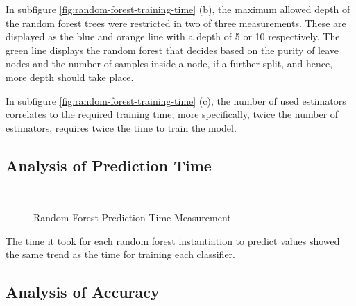 \documentclass{article}[12pt]
\theoremstyle{mydef}
\begin{document}
            In subfigure \ref{fig:random-forest-training-time} (b), the maximum allowed depth of the random forest trees were restricted in two of three measurements. 
            These are displayed as the blue and orange line with a depth of 5 or 10 respectively. 
            The green line displays the random forest that decides based on the purity of leave nodes and the number of samples inside a node, 
            if a further split, and hence, more depth should take place.

            In subfigure \ref{fig:random-forest-training-time} (c), the number of used estimators correlates to the required training time, 
            more specifically, twice the number of estimators, requires twice the time to train the model.
              
 

        \subsection{Analysis of Prediction Time}

            \begin{figure}[!h]
                \centering
                \quad
                \\
                \quad
                \caption{Random Forest Prediction Time Measurement}
                \label{fig:random-forest-prediction-time}
            \end{figure}

            The time it took for each random forest instantiation to predict values showed the same trend as the time for training each classifier.

        \subsection{Analysis of Accuracy}
\end{document}
